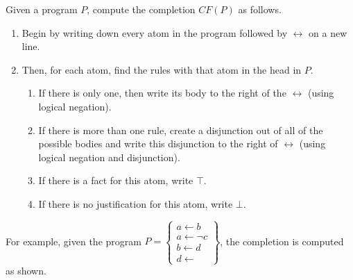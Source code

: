 \documentclass[9pt,a4paper,landscape]{article}
\begin{document}
{Given a program $P$, compute the completion $CF(P)$ as follows.

\begin{enumerate}[noitemsep]
	\item Begin by writing down every atom in the program followed by $\leftrightarrow$ on a new line.
	\item Then, for each atom, find the rules with that atom in the head in $P$.
	\begin{enumerate}[noitemsep]
		\item If there is only one, then write its body to the right of the $\leftrightarrow$ (using logical negation).
		\item If there is more than one rule, create a disjunction out of all of the possible bodies and write this disjunction to the right of $\leftrightarrow$ (using logical negation and disjunction).
		\item If there is a fact for this atom, write $\top$.
		\item If there is no justification for this atom, write $\bot$.
	\end{enumerate}
\end{enumerate}

For example, given the program $P = \left\{\begin{array}{l}
a \leftarrow b \\
a \leftarrow \neg c \\
b \leftarrow d\\
d \leftarrow 
\end{array}\right\}$, the completion is computed as shown.

}
\end{document}
